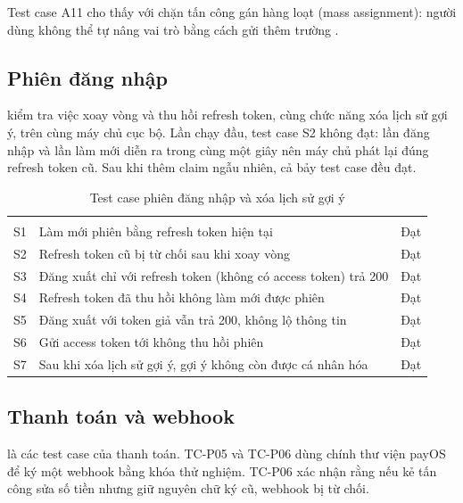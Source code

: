 Test case A11 cho thấy  với  chặn tấn công gán hàng loạt (mass assignment): người dùng không thể tự nâng vai trò bằng cách gửi thêm trường .

\subsection{Phiên đăng nhập}

 kiểm tra việc xoay vòng và thu hồi refresh token, cùng chức năng xóa lịch sử gợi ý, trên cùng máy chủ cục bộ. Lần chạy đầu, test case S2 không đạt: lần đăng nhập và lần làm mới diễn ra trong cùng một giây nên máy chủ phát lại đúng refresh token cũ. Sau khi thêm claim  ngẫu nhiên, cả bảy test case đều đạt.

\begin{rtable}
\begin{longtable}{|C{1.0cm}|L{11.0cm}|C{1.8cm}|}
\caption{Test case phiên đăng nhập và xóa lịch sử gợi ý}\label{tab:test-session}\\
\hline
{} &  &  \\ \hline
\endfirsthead
\hline
{} &  &  \\ \hline
\endhead
S1 & Làm mới phiên bằng refresh token hiện tại & Đạt \\ \hline
S2 & Refresh token cũ bị từ chối sau khi xoay vòng & Đạt \\ \hline
S3 & Đăng xuất chỉ với refresh token (không có access token) trả 200 & Đạt \\ \hline
S4 & Refresh token đã thu hồi không làm mới được phiên & Đạt \\ \hline
S5 & Đăng xuất với token giả vẫn trả 200, không lộ thông tin & Đạt \\ \hline
S6 & Gửi access token tới  không thu hồi phiên & Đạt \\ \hline
S7 & Sau khi xóa lịch sử gợi ý, gợi ý không còn được cá nhân hóa & Đạt \\ \hline
\end{longtable}
\end{rtable}

\subsection{Thanh toán và webhook}

 là các test case của thanh toán. TC-P05 và TC-P06 dùng chính thư viện payOS để ký một webhook bằng khóa thử nghiệm. TC-P06 xác nhận rằng nếu kẻ tấn công sửa số tiền nhưng giữ nguyên chữ ký cũ, webhook bị từ chối.

